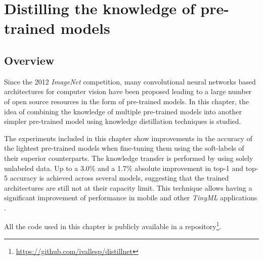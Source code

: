 \chapter{Distilling the knowledge of pre-trained models} \label{ch:distillation}
\section{Overview}
Since the 2012 \textit{ImageNet} competition, many convolutional neural networks based architectures for computer vision have been proposed leading to a large number of open source resources in the form of pre-trained models. In this chapter, the idea of combining the knowledge of multiple pre-trained models into another simpler pre-trained model using knowledge distillation techniques is studied. 

The experiments included in this chapter show improvements in the accuracy of the lightest pre-trained models when fine-tuning them using the soft-labels of their superior counterparts. The knowledge transfer is performed by using solely unlabeled data. Up to a 3.0\% and a 1.7\% absolute improvement in top-1 and top-5 accuracy is achieved across several models, suggesting that the trained architectures are still not at their capacity limit. This technique allows having a significant improvement of performance in mobile and other \textit{TinyML} applications \autocite{sanchez2020}.

 All the code used in this chapter is publicly available in a repository\footnote{\url{https://github.com/ivallesp/distillnet}}.

